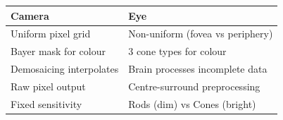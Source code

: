 \begin{center}
\renewcommand{\arraystretch}{1.3}
\begin{tabular}{@{} l l @{}}
\toprule
\textbf{Camera} & \textbf{Eye} \\
\midrule
Uniform pixel grid & Non-uniform (fovea vs periphery) \\
Bayer mask for colour & 3 cone types for colour \\
Demosaicing interpolates & Brain processes incomplete data \\
Raw pixel output & Centre-surround preprocessing \\
Fixed sensitivity & Rods (dim) vs Cones (bright) \\
\bottomrule
\end{tabular}
\end{center}
